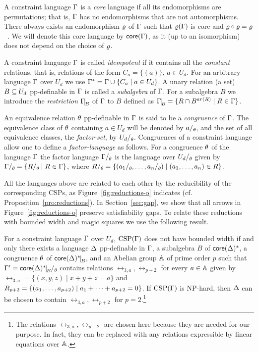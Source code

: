 \documentclass[11pt,letter]{article}
\begin{document}
A constraint language $\Gamma$ is a \emph{core} language if all its endomorphisms
are permutations; that is, $\Gamma$ has no endomorphisms that are not
automorphisms. There always exists an endomorphism $\varrho$ of $\Gamma$ such that $\varrho(\Gamma)$ is
core and $\varrho\circ\varrho=\varrho$~\cite{Bulatov05:classifying}. We will denote this core language by $\mathsf{core}(\Gamma)$, as it (up to an isomorphism) does not depend on the choice of $\varrho$.

A constraint language $\Gamma$ is called \emph{idempotent} if it contains all the
\emph{constant} relations, that is, relations of the form $C_a=\{(a)\}$, $a\in
U_d$. For an arbitrary language $\Gamma$ over $U_d$ we use $\Gamma^*=\Gamma\cup\{C_a\mid
a\in U_d\}$.  A unary relation (a set) $B\subseteq U_d$ pp-definable in $\Gamma$ is
called a \emph{subalgebra} of $\Gamma$. For a subalgebra $B$ we introduce the
\emph{restriction} $\Gm\red B$ of $\Gamma$ to $B$ defined as $\Gm\red B=\{\rel\cap
B^{ar(\rel)}\mid \rel\in\Gm\}$.

An equivalence relation $\theta$ pp-definable in $\Gamma$ is said to be a \emph{congruence} of $\Gamma$. The equivalence class of $\theta$ containing $a\in U_d$ will be denoted by $a\fac\th$, and the set of all equivalence classes, the \emph{factor-set}, by $U_d\fac\th$. Congruences of a constraint language allow one to define a \emph{factor-language} as follows. For a congruence $\theta$ of the language $\Gamma$ the factor language $\Gm\fac\th$ is the language over $U_d\fac\th$ given by $\Gm\fac\th=\{\rel\fac\th\mid \rel\in\Gm\}$, where $\rel\fac\th=\{(a_1\fac\th\zd a_n\fac\th)\mid  (\vc an)\in\rel\}$.

All the languages above are related to each other 
by the reducibility of the corresponding CSPs, as Figure~\ref{fig:reductions-o}
indicates (cf. Proposition~\ref{pro:reductions}).
In Section~\ref{sec:gap}, we show that all arrows in
Figure~\ref{fig:reductions-o} preserve satisfiability gaps.
To relate these reductions with bounded width and magic squares we use the
following result.

\begin{prop}\label{pro:abelian-o}
For a constraint language $\Gamma$ over $U_d$, ${\rm CSP}(\Gamma)$ does not have bounded
  width if and only there exists a language $\Delta$ pp-definable in $\Gamma$, a
  subalgebra $B$ of $\mathsf{core}(\Delta)^*$, a congruence $\theta$ of $\core(\Dl)^*\red B$,
  and an Abelian group ${\mathbb A}$ of prime order $p$ such that $\Gm'=\core(\Dl)^*\red B\fac\th$ contains relations $\rel_{3,a},\rel_{p+2}$ for every $a\in{\mathbb A}$ given by $\rel_{3,a}=\{(x,y,z)\mid x+y+z=a\}$ and $R_{p+2}=\{(a _1,\ldots, a _{p+2})\mid a_1+\dots+a_{p+2}=0\}$. If ${\rm CSP}(\Gamma)$ is NP-hard, then $\Delta$ can be chosen to contain $\rel_{3,a},\rel_{p+2}$ for $p=2$.\footnote{The relations $\rel_{3,a},\rel_{p+2}$ are chosen here because they are needed for our purpose. In fact, they can be replaced with any relations expressible by linear equations over ${\mathbb A}$.}
\end{prop}
\end{document}
